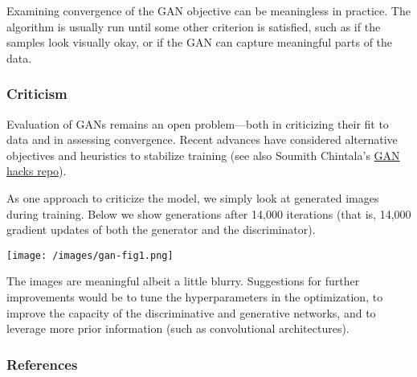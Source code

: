 Examining convergence of the GAN objective can be meaningless in
practice. The algorithm is usually run until some other criterion is
satisfied, such as if the samples look visually okay, or if the GAN
can capture meaningful parts of the data.

\subsubsection{Criticism}

Evaluation of GANs remains an open problem---both in criticizing their
fit to data and in assessing convergence.
Recent advances have considered alternative objectives and
heuristics to stabilize training (see also Soumith Chintala's
\href{https://github.com/soumith/ganhacks}{GAN hacks repo}).

As one approach to criticize the model, we simply look at generated
images during training. Below we show generations after 14,000
iterations (that is, 14,000 gradient updates of both the generator and
the discriminator).

\texttt{[image: /images/gan-fig1.png]}

The images are meaningful albeit a little blurry. Suggestions for
further improvements would be to tune the hyperparameters in the
optimization, to improve the capacity of the discriminative and
generative networks, and to leverage more prior information (such as
convolutional architectures).

\subsubsection{References}\label{references}
